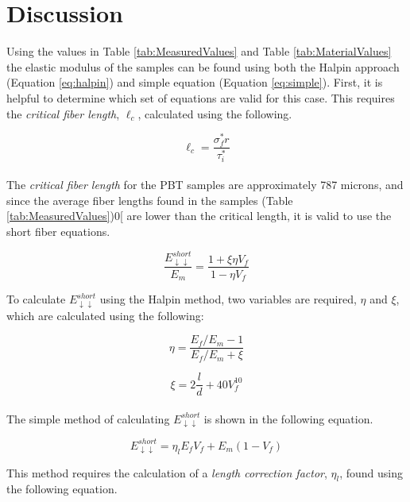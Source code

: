 \documentclass[11pt]{article}
\begin{document}
\newpage
\section{Discussion}


Using the values in Table \ref{tab:MeasuredValues} and Table \ref{tab:MaterialValues} the elastic modulus of the samples can be found using both the Halpin approach (Equation \ref{eq:halpin}) and simple equation (Equation \ref{eq:simple}). First, it is helpful to determine which set of equations are valid for this case. This requires the \textit{critical fiber length}, \(\ell_c\), calculated using the following.

\begin{equation}
\ell_c = \frac{\sigma^*_f r}{\tau^*_i}
\end{equation}
\\

The \textit{critical fiber length} for the PBT samples are approximately 787 microns, and since the average fiber lengths found in the samples (Table \ref{tab:MeasuredValues})0[ are lower than the critical length, it is valid to use the short fiber equations.

\begin{equation} \label{eq:halpin}
\frac{E^{short}_{\downarrow \downarrow}}{E_m} = \frac{1+\xi \eta V_f}{1-\eta V_f}
\end{equation}

To calculate \(E_{\downarrow \downarrow}^{short}\) using the Halpin method, two variables are required, \(\eta\) and \(\xi\), which are calculated using the following:

\begin{equation}
\eta = \frac{E_f/E_m-1}{E_f/E_m+\xi}
\end{equation}

\begin{equation}
\xi = 2 \frac{l}{d} +40V^{10}_f
\end{equation}
\\
The simple method of calculating \(E_{\downarrow \downarrow}^{short}\) is shown in the following equation.

\begin{equation} \label{eq:simple}
E^{short}_{\downarrow \downarrow} = \eta_l E_f V_f + E_m(1-V_f)
\end{equation}

This method requires the calculation of a \textit{length correction factor}, \(\eta_l\), found using the following equation.
\end{document}
